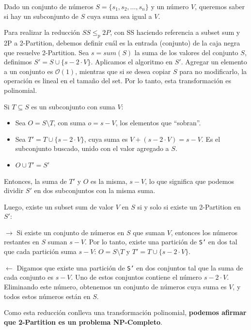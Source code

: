 \documentclass{article}
\begin{document}
Dado un conjunto de números \( S = \{s_1, s_2, \ldots, s_n\} \) y un número \( V \), queremos saber si hay un subconjunto de \( S \) cuya suma sea igual a \( V \).

Para realizar la reducción $SS \leq_p 2P$, con SS haciendo referencia a subset sum y 2P a 2-Partition, debemos definir cuál es la entrada (conjunto) de la caja negra que resuelve 2-Partition. Sea $s = sum(S)$ la suma de los valores del conjunto $S$, definimos \( S' = S \cup \{s - 2\cdot V\} \). Aplicamos el algoritmo en $S'$. Agregar un elemento a un conjunto es $\mathcal{O}(1)$, mientras que si se desea copiar $S$ para no modificarlo, la operación es lineal en el tamaño del set. Por lo tanto, esta transformación es polinomial.

Si \( T \subseteq S \) es un subconjunto con suma \( V \):

\begin{itemize}
    \item Sea \( O = S \setminus T \), con suma \( o = s - V \), los elementos que ``sobran''.
    \item Sea \( T' = T \cup \{s - 2 \cdot V\} \), cuya suma es \( V + (s - 2 \cdot V) = s - V \). Es el subconjunto buscado, unido con el valor agregado a $S$.
    \item $ O \cup T' = S'$
\end{itemize}

Entonces, la suma de \( T' \) y \( O \) es la misma, \( s - V \), lo que significa que podemos dividir \( S' \) en dos subconjuntos con la misma suma.

Luego, existe un subset sum de valor $V$ en $S$ si y solo si existe un 2-Partition en $S'$:

    $\rightarrow$ Si existe un conjunto de números en $S$ que suman $V$, entonces los números restantes en $S$ suman \(s - V\). Por lo tanto, existe una partición de \texttt{S'} en dos tal que cada partición suma \(s - V\): \( O = S \setminus T \) y \( T' = T \cup \{s - 2 \cdot V\} \). 

    $\leftarrow$ Digamos que existe una partición de \texttt{S'} en dos conjuntos tal que la suma de cada conjunto es \(s - V\). Uno de estos conjuntos contiene el número \(s - 2 \cdot V\). Eliminando este número, obtenemos un conjunto de números cuya suma es $V$, y todos estos números están en $S$.

Como esta reducción conlleva una transformación polinomial, \textbf{podemos afirmar que 2-Partition es un problema NP-Completo}.
\end{document}
